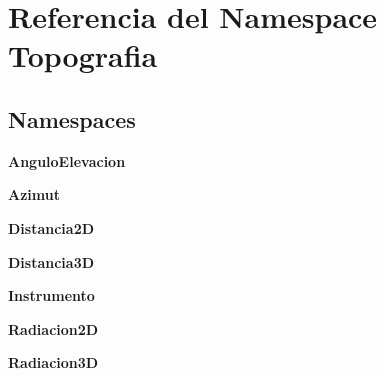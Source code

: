 \section{Referencia del Namespace Topografia}
\label{namespaceTopografia}
\subsection*{Namespaces}
\begin{DoxyCompactItemize}
\item 
{\bf Angulo\-Elevacion}
\item 
{\bf Azimut}
\item 
{\bf Distancia2\-D}
\item 
{\bf Distancia3\-D}
\item 
{\bf Instrumento}
\item 
{\bf Radiacion2\-D}
\item 
{\bf Radiacion3\-D}
\end{DoxyCompactItemize}
